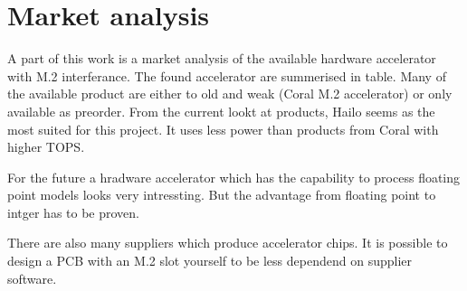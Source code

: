 \chapter{Market analysis}


A part of this work is a market analysis of the available hardware accelerator with M.2 interferance.
The found accelerator are summerised in table.
Many of the available product are either to old and weak (Coral M.2 accelerator) or only available as preorder.
From the current lookt at products, Hailo seems as the most suited for this project.
It uses less power than products from Coral with higher TOPS.

For the future a hradware accelerator which has the capability to process floating point models looks very intressting.
But the advantage from floating point to intger has to be proven.

There are also many suppliers which produce accelerator chips.
It is possible to design a PCB with an M.2 slot yourself to be less dependend on supplier software.



